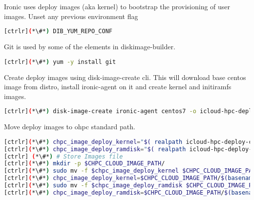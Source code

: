 Ironic uses deploy images (aka kernel) to bootstrap the provisioning of user images. 
Unset any previous environment flag

\begin{lstlisting}[language=bash,keywords={}]
[ctrlr](*\#*) DIB_YUM_REPO_CONF
\end{lstlisting}

Git is used by some of the elements in diskimage-builder. 

\begin{lstlisting}[language=bash,keywords={}]
[ctrlr](*\#*) yum -y install git
\end{lstlisting}

Create deploy images using disk-image-create cli. This will download base centos image from distro, install ironic-agent on it and create kernel and initiramfs images.

\begin{lstlisting}[language=bash,keywords={}]
[ctrlr](*\#*) disk-image-create ironic-agent centos7 -o icloud-hpc-deploy-c7
\end{lstlisting}

Move deploy images to ohpc standard path.

\begin{lstlisting}[language=bash,keywords={}]
[ctrlr](*\#*) chpc_image_deploy_kernel="$( realpath icloud-hpc-deploy-c7.kernel)"
[ctrlr](*\#*) chpc_image_deploy_ramdisk="$( realpath icloud-hpc-deploy-c7.initramfs)"
[ctrlr] (*\#*) # Store Images file
[ctrlr](*\#*) mkdir -p $CHPC_CLOUD_IMAGE_PATH/
[ctrlr](*\#*) sudo mv -f $chpc_image_deploy_kernel $CHPC_CLOUD_IMAGE_PATH/
[ctrlr](*\#*) chpc_image_deploy_kernel=$CHPC_CLOUD_IMAGE_PATH/$(basename $chpc_image_deploy_kernel)
[ctrlr](*\#*) sudo mv -f $chpc_image_deploy_ramdisk $CHPC_CLOUD_IMAGE_PATH/
[ctrlr](*\#*) chpc_image_deploy_ramdisk=$CHPC_CLOUD_IMAGE_PATH/$(basename $chpc_image_deploy_ramdisk)
\end{lstlisting}